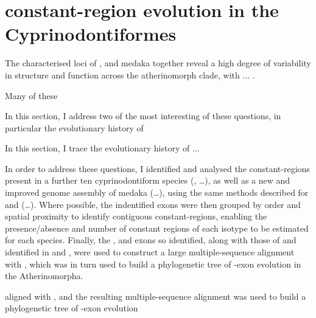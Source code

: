 
\section{\igh{} constant-region evolution in the Cyprinodontiformes}
\label{sec:comparative}

The characterised \igh{} loci of \nfu, \xma and medaka together reveal a high degree of variability in structure and function across the atherinomorph clade, with ... .


Many of these 

In this section, I address two of the most interesting of these questions, in particular the evolutionary history of 
	
In this section, I trace the evolutionary history of ...
	
In order to address these questions, I identified and analysed the \igh{} constant-regions present in a further ten cyprinodontiform species (, \dots), %
as well as a new and improved genome assembly of medaka (\dots), %
using the same methods described for \Nfu and \Xma (\dots). %
Where possible, the indentified exons were then grouped by order and spatial proximity to identify contiguous constant-regions, enabling the presence/absence and number of constant regions of each isotype to be estimated for each species. %
Finally, the \cm{}, \cd{} and \cz{} exons so identified, along with those of \Nfu and \Xma identified in  and , were used to construct a large multiple-sequence alignment with , which was in turn used to build a phylogenetic tree of \ch{}-exon evolution in the Atherinomorpha.

 aligned with , and the resulting multiple-sequence alignment was used to build a phylogenetic tree of \ch-exon evolution 
 
